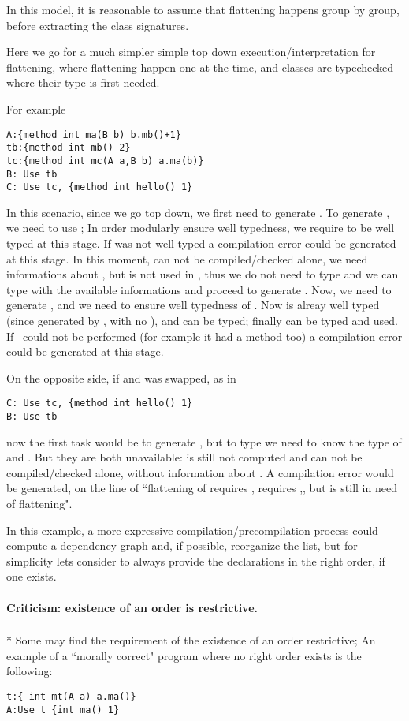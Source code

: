 In this model, it is reasonable to assume that flattening happens group by group, before
extracting the class signatures.

Here we go for a much simpler simple top down execution/interpretation for flattening, where flattening
happen one at the time, and classes are typechecked where their type is first needed.

For example
\begin{lstlisting}
A:{method int ma(B b) b.mb()+1}
tb:{method int mb() 2}
tc:{method int mc(A a,B b) a.ma(b)}
B: Use tb
C: Use tc, {method int hello() 1}
\end{lstlisting}
In this scenario, since we go top down, we first need to generate \Q@B@.
To generate \Q@B@, we need to use \Q@tb@;
In order modularly ensure well typedness,
we require \Q@tb@ to be well typed at this stage. If \Q@tb@ was not well typed
a compilation error could be generated at this stage.
In this moment, \Q@A@ can not be compiled/checked alone,
we need informations about \Q@B@, but \Q@A@ is not used in \Q@tb@,
thus we do not need to type \Q@A@ and we can type \Q@tb@ with
 the available informations and proceed to generate \Q@B@.
Now, we need to generate \Q@C@, and we need to ensure well typedness of \Q@tc@.
Now \Q@B@ is alreay well typed (since generated by \use \Q@tb@, with no \mL),
and \Q@A@ can be typed;  finally \Q@tc@ can be typed and used.
If \use\ could not be performed (for example it \Q@tc@ had a method \Q@hello@ too)
a compilation error could be generated at this stage.

On the opposite side, if \Q@B@ and \Q@C@ was swapped, as in
\begin{lstlisting}
C: Use tc, {method int hello() 1}  
B: Use tb
\end{lstlisting}

now the first task would be to generate \Q@C@, but 
to type \Q@tc@ we need to know the type of \Q@A@ and \Q@B@.
But they are both unavailable: \Q@B@ is still not computed and 
\Q@A@ can not be compiled/checked alone, without information about \Q@B@.
A compilation error would be generated, on the line of ``flattening of \Q@C@
requires \Q@tc@, \Q@tc@ requires \Q@A@,\Q@B@, but \Q@B@ is still in need of flattening".

In this example, a more expressive compilation/precompilation process 
could compute a dependency graph and, if possible, reorganize the list,
but for simplicity lets consider to always provide the declarations
in the right order, if one exists.

\paragraph*{Criticism: existence of an order is restrictive.}${}_{}$\\*
Some may find the requirement of the existence of an order restrictive;
An example of a ``morally correct" program where no right order exists is the following:
\begin{lstlisting}
t:{ int mt(A a) a.ma()}
A:Use t {int ma() 1}
\end{lstlisting}


